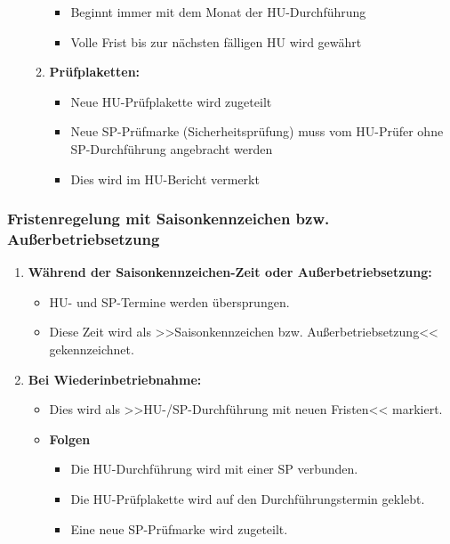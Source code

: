 \documentclass{vorlage-design-main}
\begin{document}
\begin{enumerate}
\begin{enumerate}
    \begin{itemize}
    
    \item
      Beginnt immer mit dem Monat der HU-Durchführung
    \item
      Volle Frist bis zur nächsten fälligen HU wird gewährt
    \end{itemize}
  \item
    \textbf{Prüfplaketten:}

    \begin{itemize}
    
    \item
      Neue HU-Prüfplakette wird zugeteilt
    \item
      Neue SP-Prüfmarke (Sicherheitsprüfung) muss vom HU-Prüfer ohne
      SP-Durchführung angebracht werden
    \item
      Dies wird im HU-Bericht vermerkt
    \end{itemize}
  \end{enumerate}
\end{enumerate}

\subsubsection{Fristenregelung mit Saisonkennzeichen bzw.
Außerbetriebsetzung}\label{fristenregelung-mit-saisonkennzeichen-bzw.-ausserbetriebsetzung}

\begin{enumerate}
\def\labelenumi{\arabic{enumi}.}

\item
  \textbf{Während der Saisonkennzeichen-Zeit oder Außerbetriebsetzung:}

  \begin{itemize}
  
  \item
    HU- und SP-Termine werden übersprungen.
  \item
    Diese Zeit wird als >>Saisonkennzeichen bzw. Außerbetriebsetzung<<
    gekennzeichnet.
  \end{itemize}
\item
  \textbf{Bei Wiederinbetriebnahme:}

  \begin{itemize}
  
  \item
    Dies wird als >>HU-/SP-Durchführung mit neuen Fristen<< markiert.
  \item
    \textbf{Folgen}

    \begin{itemize}
    
    \item
      Die HU-Durchführung wird mit einer SP verbunden.
    \item
      Die HU-Prüfplakette wird auf den Durchführungstermin geklebt.
    \item
      Eine neue SP-Prüfmarke wird zugeteilt.
    \end{itemize}
  \end{itemize}
\end{enumerate}
\end{document}
